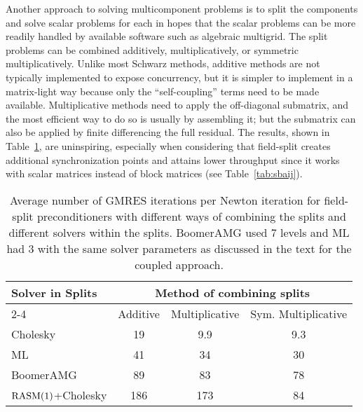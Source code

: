 Another approach to solving multicomponent problems is to split the components and solve scalar problems for each in hopes that the scalar problems can be more readily handled by available software such as algebraic multigrid.  The split problems can be combined additively, multiplicatively, or symmetric multiplicatively.  Unlike most Schwarz methods, additive methods are not typically implemented to expose concurrency, but it is simpler to implement in a matrix-light way because only the ``self-coupling'' terms need to be made available.  Multiplicative methods need to apply the off-diagonal submatrix, and the most efficient way to do so is usually by assembling it; but the submatrix can also be applied by finite differencing the full residual.  The results, shown in Table~\ref{tab:fieldsplit}, are uninspiring, especially when considering that field-split creates additional synchronization points and attains lower throughput since it works with scalar matrices instead of block matrices (see Table~\ref{tab:sbaij}).

\begin{table}
  \centering\caption{Average number of GMRES iterations per Newton iteration for field-split preconditioners with different ways of combining the splits and different solvers within the splits.
BoomerAMG used 7 levels and ML had 3 with the same solver parameters as discussed in the text for the coupled approach.}\label{tab:fieldsplit}
  \begin{tabular}{lccc}
    \toprule
    \multirow{3}{*}{Solver in Splits} & \multicolumn{3}{c}{Method of combining splits} \\
    \cmidrule{2-4}
     & Additive & Multiplicative & Sym. Multiplicative \\
    \midrule
    Cholesky            & 19       & 9.9            & 9.3                 \\
    ML                  & 41       & 34             & 30                  \\
    BoomerAMG           & 89       & 83             & 78                  \\
    $\mathrm{RASM}(1)$+Cholesky & 186      & 173            & 84                  \\
    \bottomrule
  \end{tabular}
\end{table}

